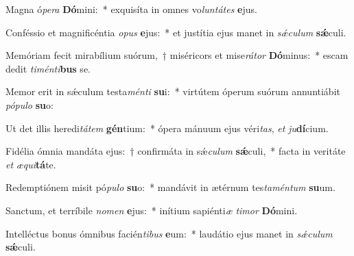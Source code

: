 \item Magna ó\textit{pe}\textit{ra} \textbf{Dó}mini:~* exquisíta in omnes vo\textit{lun}\textit{tá}\textit{tes} \textbf{e}jus.
\item Conféssio et magnificéntia \textit{o}\textit{pus} \textbf{e}jus:~* et justítia ejus manet in \textit{sǽ}\textit{cu}\textit{lum} \textbf{sǽ}culi.
\item Memóriam fecit mirabílium suórum,~† miséricors et mise\textit{rá}\textit{tor} \textbf{Dó}minus:~* escam dedit \textit{ti}\textit{mén}\textit{ti}\textbf{bus} se.
\item Memor erit in sǽculum testa\textit{mén}\textit{ti} \textbf{su}i:~* virtútem óperum suórum annuntiábit \textit{pó}\textit{pu}\textit{lo} \textbf{su}o:
\item Ut det illis heredi\textit{tá}\textit{tem} \textbf{gén}tium:~* ópera mánuum ejus véri\textit{tas}, \textit{et} \textit{ju}\textbf{dí}cium.
\item Fidélia ómnia mandáta ejus:~† confirmáta in sǽ\textit{cu}\textit{lum} \textbf{sǽ}culi,~* facta in veritáte \textit{et} \textit{æ}\textit{qui}\textbf{tá}te.
\item Redemptiónem misit pó\textit{pu}\textit{lo} \textbf{su}o:~* mandávit in ætérnum tes\textit{ta}\textit{mén}\textit{tum} \textbf{su}um.
\item Sanctum, et terríbile \textit{no}\textit{men} \textbf{e}jus:~* inítium sapiénti\textit{æ} \textit{ti}\textit{mor} \textbf{Dó}mini.
\item Intelléctus bonus ómnibus facién\textit{ti}\textit{bus} \textbf{e}um:~* laudátio ejus manet in \textit{sǽ}\textit{cu}\textit{lum} \textbf{sǽ}culi.
